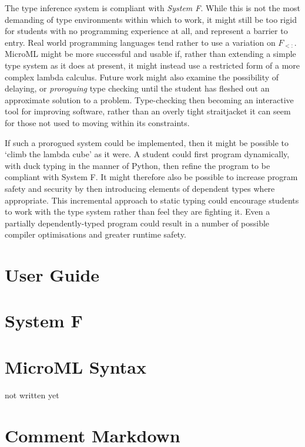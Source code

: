 \documentclass[12pt, a4paper]{report}
\begin{document}
The type inference system is compliant with \textit{System F}. While this is not the most demanding
of type environments within which to work, it might still be too rigid for students with no
programming experience at all, and represent a barrier to entry. Real world programming languages
tend rather to use a variation on $F_{<:}$. MicroML might be more successful and usable if, rather
than extending a simple type system as it does at present, it might instead use a restricted form
of a more complex lambda calculus. Future work might also examine the possibility of delaying, or
\textit{proroguing} type checking until the student has fleshed out an approximate solution to a
problem\cite{Afshari:2012:LPP:2384592.2384595}. Type-checking then becoming an interactive tool
for improving software, rather than an overly tight straitjacket it can seem for those not used to
moving within its constraints.

If such a prorogued system could be implemented, then it might be possible to `climb the lambda
cube' as it were. A student could first program dynamically, with duck typing in the manner of
Python, then refine the program to be compliant with System F. It might therefore also be possible
to increase program safety and security by then introducing elements of dependent types where
appropriate. This incremental approach to static typing could encourage students to work with the
type system rather than feel they are fighting it. Even a partially dependently-typed program could
result in a number of possible compiler optimisations and greater runtime safety.

\begin{appendices}
    \chapter{User Guide}
    
    \chapter{System F}
    \label{appendix:sysf}
    
    \chapter{MicroML Syntax}
    \label{appendix:syntax}
    not written yet
    \chapter{Comment Markdown}
    \label{appendix:md}
    
\end{appendices}

\nocite{adams2012layout}
\nocite{9780511608865}
\nocite{Wadler:1995:MFP:647698.734146}

{}

\end{document}
